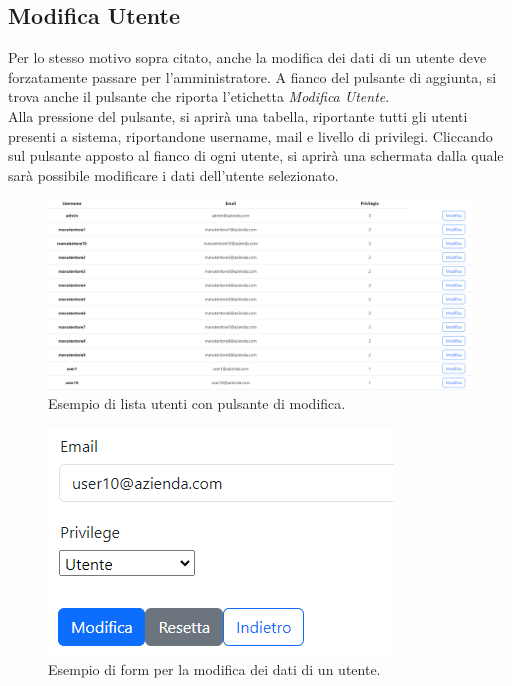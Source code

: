 \documentclass[a4paper, 12pt]{article}
\begin{document}
\subsection{Modifica Utente}
Per lo stesso motivo sopra citato, anche la modifica dei dati di un utente deve forzatamente passare per l'amministratore. A fianco del pulsante di aggiunta, si trova anche il pulsante che riporta l'etichetta \textit{Modifica Utente}.\\
Alla pressione del pulsante, si aprirà una tabella, riportante tutti gli utenti presenti a sistema, riportandone username, mail e livello di privilegi. Cliccando sul pulsante apposto al fianco di ogni utente, si aprirà una schermata dalla quale sarà possibile modificare i dati dell'utente selezionato.

\begin{figure}[H]
    \centering
    \includegraphics[width=\textwidth]{ListaUtenti}
    \caption{Esempio di lista utenti con pulsante di modifica.}
\end{figure}

\begin{figure}[H]
    \centering
    \includegraphics[width=\textwidth]{FormModificaUtente}
    \caption{Esempio di form per la modifica dei dati di un utente.}
\end{figure}
\end{document}
